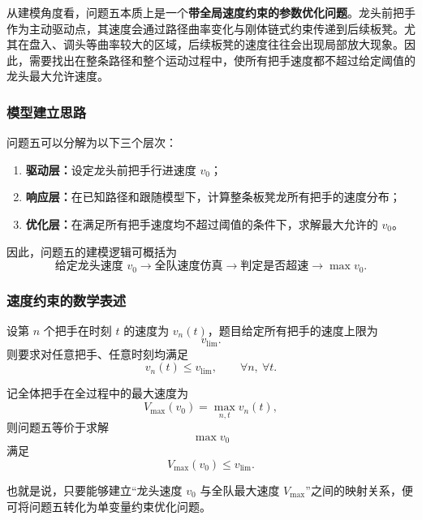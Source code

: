 \documentclass[12pt,a4paper]{ctexart}
\begin{document}
从建模角度看，问题五本质上是一个\textbf{带全局速度约束的参数优化问题}。龙头前把手作为主动驱动点，其速度会通过路径曲率变化与刚体链式约束传递到后续板凳。尤其在盘入、调头等曲率较大的区域，后续板凳的速度往往会出现局部放大现象。因此，需要找出在整条路径和整个运动过程中，使所有把手速度都不超过给定阈值的龙头最大允许速度。

\subsubsection{模型建立思路}
问题五可以分解为以下三个层次：

\begin{enumerate}
    \item \textbf{驱动层：}设定龙头前把手行进速度 $v_0$；
    \item \textbf{响应层：}在已知路径和跟随模型下，计算整条板凳龙所有把手的速度分布；
    \item \textbf{优化层：}在满足所有把手速度均不超过阈值的条件下，求解最大允许的 $v_0$。
\end{enumerate}

因此，问题五的建模逻辑可概括为
\[
\text{给定龙头速度 } v_0 \longrightarrow \text{全队速度仿真} \longrightarrow \text{判定是否超速} \longrightarrow \max v_0.
\]

\subsubsection{速度约束的数学表述}
设第 $n$ 个把手在时刻 $t$ 的速度为 $v_n(t)$，题目给定所有把手的速度上限为
\begin{equation}
v_{\mathrm{lim}}.
\end{equation}
则要求对任意把手、任意时刻均满足
\begin{equation}
v_n(t)\le v_{\mathrm{lim}}, \qquad \forall n,\ \forall t.
\end{equation}

记全体把手在全过程中的最大速度为
\begin{equation}
V_{\max}(v_0)=\max_{n,t} v_n(t),
\end{equation}
则问题五等价于求解
\begin{equation}
\max v_0
\end{equation}
满足
\begin{equation}
V_{\max}(v_0)\le v_{\mathrm{lim}}.
\end{equation}

也就是说，只要能够建立“龙头速度 $v_0$ 与全队最大速度 $V_{\max}$”之间的映射关系，便可将问题五转化为单变量约束优化问题。
\end{document}
